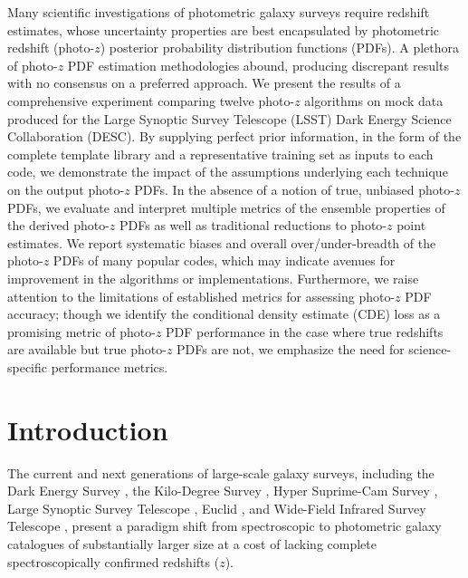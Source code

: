 Many scientific investigations of photometric galaxy surveys require redshift estimates, whose uncertainty properties are best encapsulated by photometric redshift (photo-$z$) posterior probability distribution functions (PDFs).
A plethora of photo-$z$ PDF estimation methodologies abound, producing discrepant results with no consensus on a preferred approach.
We present the results of a comprehensive experiment comparing twelve photo-$z$ algorithms on mock data produced for the Large Synoptic Survey Telescope (\textsc{LSST}) Dark Energy Science Collaboration (\textsc{DESC}).
By supplying perfect prior information, in the form of the complete template library and a representative training set as inputs to each code, we demonstrate the impact of the assumptions underlying each technique on the output photo-$z$ PDFs.
In the absence of a notion of true, unbiased photo-$z$ PDFs, we evaluate and interpret multiple metrics of the ensemble properties of the derived photo-$z$ PDFs as well as traditional reductions to photo-$z$ point estimates.
We report systematic biases and overall over/under-breadth of the photo-$z$ PDFs of many popular codes, which may indicate avenues for improvement in the algorithms or implementations.
Furthermore, we raise attention to the limitations of established metrics for assessing photo-$z$ PDF accuracy; though we identify the conditional density estimate (CDE) loss as a promising metric of photo-$z$ PDF performance in the case where true redshifts are available but true photo-$z$ PDFs are not, we emphasize the need for science-specific performance metrics.

\section{Introduction}

The current and next generations of large-scale galaxy surveys, including the Dark Energy Survey \citep[\des,][]{Abbott:05}, the Kilo-Degree Survey \citep[\kids,][]{de_Jong:13}, Hyper Suprime-Cam Survey \citep[\hsc,][]{Aihara:2018a,Aihara:2018b}, Large Synoptic Survey Telescope \citep[\lsst,][]{Abell:09}, Euclid \citep{Laureijs:11}, and Wide-Field Infrared Survey Telescope \citep[\wfirst,][]{Green:12}, present a paradigm shift from spectroscopic to photometric galaxy catalogues of substantially larger size at a cost of lacking complete spectroscopically confirmed redshifts ($z$).


